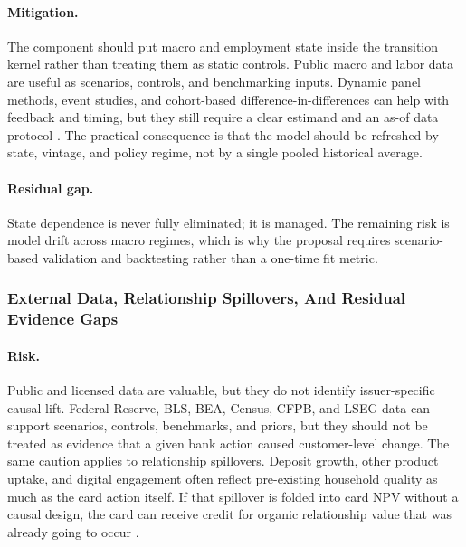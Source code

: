\documentclass[11pt]{article}
\newcommand{\1}{\mathbf{1}}
\begin{document}
\paragraph{Mitigation.}
The component should put macro and employment state inside the transition
kernel rather than treating them as static controls. Public macro and labor
data are useful as scenarios, controls, and benchmarking inputs. Dynamic panel
methods, event studies, and cohort-based difference-in-differences can help
with feedback and timing, but they still require a clear estimand and an as-of
data protocol \citep{arellano1991panel,blundell1998initial,
callaway2021did,sun2021eventstudy}. The practical consequence is that the
model should be refreshed by state, vintage, and policy regime, not by a
single pooled historical average.

\paragraph{Residual gap.}
State dependence is never fully eliminated; it is managed. The remaining risk
is model drift across macro regimes, which is why the proposal requires
scenario-based validation and backtesting rather than a one-time fit metric.

\subsubsection{External Data, Relationship Spillovers, And Residual Evidence Gaps}

\paragraph{Risk.}
Public and licensed data are valuable, but they do not identify issuer-specific
causal lift. Federal Reserve, BLS, BEA, Census, CFPB, and LSEG data can
support scenarios, controls, benchmarks, and priors, but they should not be
treated as evidence that a given bank action caused customer-level change.
The same caution applies to relationship spillovers. Deposit growth, other
product uptake, and digital engagement often reflect pre-existing household
quality as much as the card action itself. If that spillover is folded into
card NPV without a causal design, the card can receive credit for organic
relationship value that was already going to occur
\citep{federalreserveEFA,federalreserveG19,federalreserveZ1,nyfedHhdc,
blsLAUS,beaRegional,censusACS,cfpbCreditCardData,fredALFRED,lsegWorkspace,
lsegEconomicData}.
\end{document}
